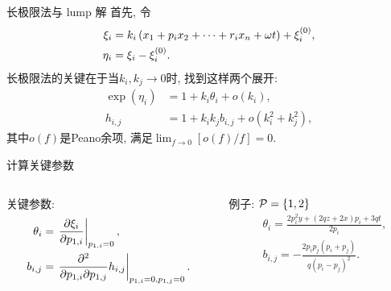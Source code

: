 \begin{frame}{长极限法与 lump 解}
首先, 令
\begin{equation}
\begin{aligned}
    \xi_i&=k_i\left(x_1+p_ix_2+\cdots+r_ix_n+\omega t\right)+\xi_i^{(0)},\\
    \eta_i&=\xi_i-\xi_i^{(0)}.
\end{aligned}
\end{equation}
长极限法的关键在于当$k_i,k_j\rightarrow 0$时, 找到这样两个展开:
\begin{equation}
\begin{aligned}
    \exp(\eta_i)&=1+k_i \theta_i+o(k_i), \\ 
    h_{i,j}&=1+k_ik_jb_{i,j}+o(k_i^2+k_j^2),
\end{aligned} \label{lump-expansion}
\end{equation}
其中$o(f)$是Peano余项, 满足$\lim_{f\rightarrow 0}[o(f)/f]=0$.
\end{frame}

\begin{frame}{计算关键参数}
\begin{columns}
\begin{column}{0.5\textwidth}
关键参数:
\[
\begin{aligned}
    \theta_i &= \left.{\frac{\partial \xi_i}{\partial p_{1,i}}}\right|_{p_{1,i}=0}, \\
    b_{i,j}&= \left.{\frac{\partial^2}{\partial p_{1,i}\partial p_{1,j}}h_{i,j}}\right|_{p_{1,i}=0,p_{1,j}=0}.
\end{aligned}
\]
\end{column}
\begin{column}{0.5\textwidth}
例子: $\mathcal{P}=\left\{1,2\right\}$
\[
\begin{aligned}
    &\theta_i=\frac{2p_i^2y+(2qz+2x)p_i+3qt}{2p_i}, \\ 
    &b_{i,j}=-\frac{2p_ip_j(p_i+p_j)}{q(p_i-p_j)^2}.
\end{aligned}
\]
\end{column}
\end{columns}
\end{frame}

